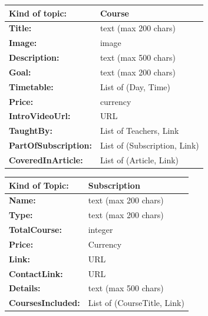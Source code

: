 \documentclass{article}
\begin{document}
\begin{center}
        \begin{tabularx}{\textwidth}{|>{\bfseries}l|X|}
                \hline
                Kind of topic: & \textbf{Course} \\
                \hline
                Title: & text  (max 200 chars)\\
                \hline
                Image: & image \\
                \hline
                Description: & text (max 500 chars) \\
                \hline
                Goal: & text (max 200 chars) \\
                \hline
                Timetable: & List of {(Day, Time)}\\
                \hline
                Price: & currency \\
                \hline
                IntroVideoUrl: & URL \\
                \hline
                TaughtBy: & List of {Teachers, Link} \\
                \hline
                PartOfSubscription: & List of {(Subscription, Link)} \\
                \hline
                CoveredInArticle: & List of {(Article, Link)}\\
                \hline
        \end{tabularx}
        \caption{Table: Course}
\end{center}

\begin{center}
        \begin{tabularx}{\textwidth}{|>{\bfseries}l|X|}
                \hline
                Kind of Topic: & \textbf{Subscription} \\
                \hline
                Name: & text  (max 200 chars)\\
                \hline
                Type: & text (max 200 chars) \\
                \hline
                TotalCourse: & integer \\
                \hline
                Price: & Currency \\
                \hline
                Link: & URL \\
                \hline
                ContactLink: & URL \\
                \hline
                Details: & text (max 500 chars) \\
                \hline
                CoursesIncluded: & List of {(CourseTitle, Link)}\\
                \hline
        \end{tabularx}
        \caption{Table: Equipement}
\end{center}
\end{document}
